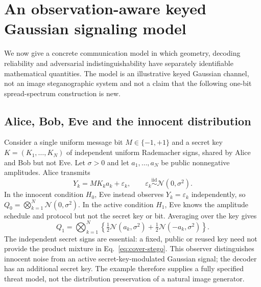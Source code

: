 \documentclass[preprint,12pt]{elsarticle}
\newcommand{\cN}{\mathcal N}
\begin{document}
\section{An observation-aware keyed Gaussian signaling model}
\label{sec:keyed}
We now give a concrete communication model in which geometry,
decoding reliability and adversarial indistinguishability have
separately identifiable mathematical quantities.
The model is an illustrative keyed Gaussian channel, not an
image steganographic system and not a claim that the following
one-bit spread-spectrum construction is new.


\subsection{Alice, Bob, Eve and the innocent distribution}
Consider a single uniform message bit
$M\in\{-1,+1\}$ and a secret key
$K=(K_1,\ldots,K_N)$ of independent uniform
Rademacher signs, shared by Alice and Bob but not Eve.
Let $\sigma>0$ and let $a_1,\ldots,a_N$ be public
nonnegative amplitudes.
Alice transmits
\begin{equation}
Y_k= M K_k a_k+\varepsilon_k,\qquad
\varepsilon_k\overset{\mathrm{iid}}{\sim}\cN(0,\sigma^2).
\label{eq:encoder}
\end{equation}
In the innocent condition $H_0$, Eve instead observes
$Y_k=\varepsilon_k$ independently, so
$Q_0=\bigotimes_{k=1}^N\cN(0,\sigma^2)$.
In the active condition $H_1$, Eve knows the amplitude
schedule and protocol but not the secret key or bit.
Averaging over the key gives
\begin{equation}
Q_1=\bigotimes_{k=1}^N
\left\{\tfrac12\cN(a_k,\sigma^2)+
       \tfrac12\cN(-a_k,\sigma^2)\right\}.
\label{eq:cover-stego}
\end{equation}
The independent secret signs are essential: a fixed,
public or reused key need not provide the product mixture
in Eq.~\eqref{eq:cover-stego}.
This observer distinguishes innocent noise
from an active secret-key-modulated Gaussian signal;
the decoder has an additional secret key. The example
therefore supplies a fully specified threat model, not
the distribution preservation of a natural image generator.
\end{document}
